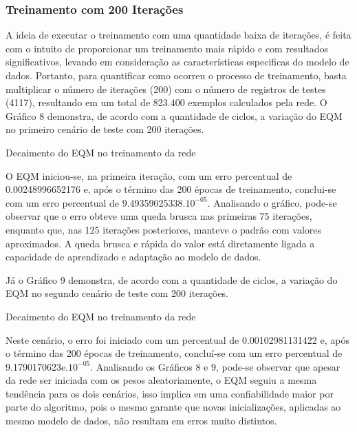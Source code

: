 \subsubsection{Treinamento com 200 Iterações}	
A ideia de executar o treinamento com uma quantidade baixa de iterações, é feita com o intuito de proporcionar um treinamento mais rápido e com resultados significativos, levando em consideração as características especificas do modelo de dados. Portanto, para quantificar como ocorreu o processo de treinamento, basta multiplicar o número de iterações (200) com o número de registros de testes (4117), resultando em um total de 823.400 exemplos calculados pela rede. O Gráfico 8 demonstra, de acordo com a quantidade de ciclos, a variação do EQM no primeiro cenário de teste com 200 iterações.
\begin{grafico}[h]
	\centering
	\caption{Decaimento do EQM no treinamento da rede}
	\label{lingua}
\end{grafico}

O EQM iniciou-se, na primeira iteração, com um erro percentual de 0.00248996652176 e, após o término das 200 épocas de treinamento, conclui-se com um erro percentual de 9.49359025338.$10^{-05}$. Analisando o gráfico, pode-se observar que o erro obteve uma queda brusca nas primeiras 75 iterações, enquanto que, nas 125 iterações posteriores, manteve o padrão com valores aproximados. A queda brusca e rápida do valor está diretamente ligada a capacidade de aprendizado e adaptação ao modelo de dados.

Já o Gráfico 9 demonstra, de acordo com a quantidade de ciclos, a variação do EQM no segundo cenário de teste com 200 iterações.
\begin{grafico}[h]
	\centering
	\caption{Decaimento do EQM no treinamento da rede}
	\label{lingua}
\end{grafico}

Neste cenário, o erro foi iniciado com um percentual de 0.00102981131422 e, após o término das 200 épocas de treinamento, concluí-se com um erro percentual de 9.1790170623e.$10^{-05}$. Analisando os Gráficos 8 e 9, pode-se observar que apesar da rede ser iniciada com os pesos aleatoriamente, o EQM seguiu a mesma tendência para os dois cenários, isso implica em uma confiabilidade maior por parte do algoritmo, pois o mesmo garante que novas inicializações, aplicadas ao mesmo modelo de dados, não resultam em erros muito distintos.

